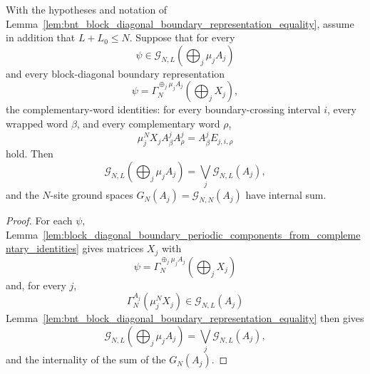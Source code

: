 \begin{lemma}
    \label{lem:bnt_block_diagonal_complementary_identities_equality}
    \leanok
    With the hypotheses and notation of
    Lemma~\ref{lem:bnt_block_diagonal_boundary_representation_equality}, assume
    in addition that \(L+L_0\le N\). Suppose that for every
    \[
        \psi\in
        \mathcal G_{N,L}\!\left(\bigoplus_j\mu_jA_j\right)
    \]
    and every block-diagonal boundary representation
    \[
        \psi=\Gamma_N^{\oplus_j\mu_jA_j}\!\left(\bigoplus_jX_j\right),
    \]
    the complementary-word identities: for every boundary-crossing interval
    \(i\), every wrapped word \(\beta\), and every complementary word \(\rho\),
    \[
        \mu_j^N X_jA^j_\beta A^j_\rho=A^j_\beta E_{j,i,\rho}
    \]
    hold. Then
    \[
        \mathcal G_{N,L}\!\left(\bigoplus_j\mu_jA_j\right)
        =
        \bigvee_j\mathcal G_{N,L}(A_j),
    \]
    and the \(N\)-site ground spaces \(G_N(A_j)=\mathcal G_{N,N}(A_j)\)
    have internal sum.
\end{lemma}

\begin{proof}
    \leanok
    For each \(\psi\),
    Lemma~\ref{lem:block_diagonal_boundary_periodic_components_from_complementary_identities}
    gives matrices \(X_j\) with
    \[
        \psi=\Gamma_N^{\oplus_j\mu_jA_j}\!\left(\bigoplus_jX_j\right)
    \]
    and, for every \(j\),
    \[
        \Gamma_N^{A_j}(\mu_j^NX_j)\in\mathcal G_{N,L}(A_j)
    \]
    Lemma~\ref{lem:bnt_block_diagonal_boundary_representation_equality}
    then gives
    \[
        \mathcal G_{N,L}\!\left(\bigoplus_j\mu_jA_j\right)
        =
        \bigvee_j\mathcal G_{N,L}(A_j),
    \]
    and the internality of the sum of the \(G_N(A_j)\).
\end{proof}

